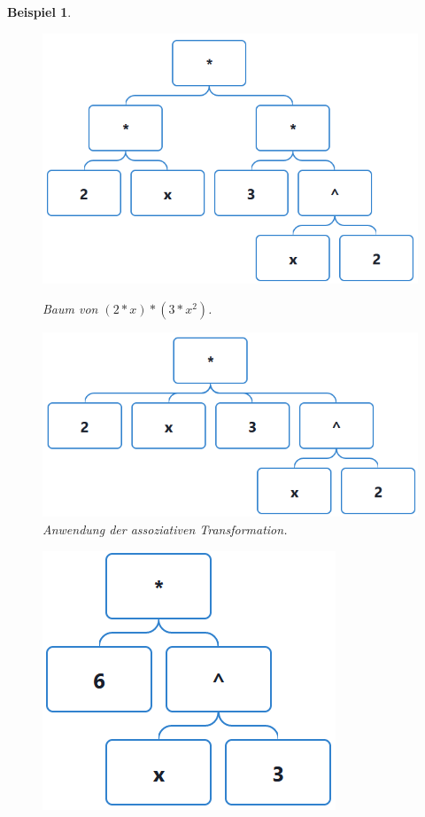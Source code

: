 \documentclass[11pt]{article}
\newtheorem{example}{Beispiel}
\begin{document}
\begin{example} \normalfont
  \begin{figure}[h]
    \begin{minipage}{.5\textwidth}
      \centering
      \includegraphics[scale=0.45]{trees/product/beispiel_1_1.png}
      \caption{Baum von $(2*x)*(3*x^2)$.}
    \end{minipage}
    \begin{minipage}{.5\textwidth}
      \centering
      \includegraphics[scale=0.45]{trees/product/beispiel_1_2.png}
      \caption{Anwendung der assoziativen Transformation.}
    \end{minipage}
  \end{figure}
  \begin{figure}[h]
    \centering
    \includegraphics*[scale=0.5]{trees/product/beispiel_1_3.png}

\end{figure}
\end{example}
\end{document}
